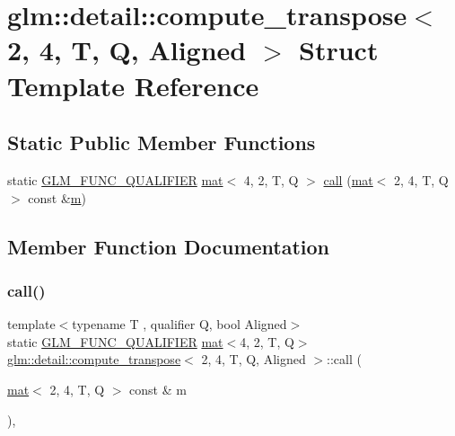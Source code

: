 \hypertarget{structglm_1_1detail_1_1compute__transpose_3_012_00_014_00_01_t_00_01_q_00_01_aligned_01_4}{}\section{glm\+:\+:detail\+:\+:compute\+\_\+transpose$<$ 2, 4, T, Q, Aligned $>$ Struct Template Reference}
\label{structglm_1_1detail_1_1compute__transpose_3_012_00_014_00_01_t_00_01_q_00_01_aligned_01_4}
\subsection*{Static Public Member Functions}
\begin{DoxyCompactItemize}
\item 
static \mbox{\hyperlink{setup_8hpp_a33fdea6f91c5f834105f7415e2a64407}{G\+L\+M\+\_\+\+F\+U\+N\+C\+\_\+\+Q\+U\+A\+L\+I\+F\+I\+ER}} \mbox{\hyperlink{structglm_1_1mat}{mat}}$<$ 4, 2, T, Q $>$ \mbox{\hyperlink{structglm_1_1detail_1_1compute__transpose_3_012_00_014_00_01_t_00_01_q_00_01_aligned_01_4_a520d7f20fa96a98fd40229e593ac0b2a}{call}} (\mbox{\hyperlink{structglm_1_1mat}{mat}}$<$ 2, 4, T, Q $>$ const \&\mbox{\hyperlink{_s_d_l__opengl__glext_8h_af593500c283bf1a787a6f947f503a5c2}{m}})
\end{DoxyCompactItemize}


\subsection{Member Function Documentation}
\mbox{\label{structglm_1_1detail_1_1compute__transpose_3_012_00_014_00_01_t_00_01_q_00_01_aligned_01_4_a520d7f20fa96a98fd40229e593ac0b2a}} 
\subsubsection{\texorpdfstring{call()}{call()}}
{\footnotesize\ttfamily template$<$typename T , qualifier Q, bool Aligned$>$ \\
static \mbox{\hyperlink{setup_8hpp_a33fdea6f91c5f834105f7415e2a64407}{G\+L\+M\+\_\+\+F\+U\+N\+C\+\_\+\+Q\+U\+A\+L\+I\+F\+I\+ER}} \mbox{\hyperlink{structglm_1_1mat}{mat}}$<$4, 2, T, Q$>$ \mbox{\hyperlink{structglm_1_1detail_1_1compute__transpose}{glm\+::detail\+::compute\+\_\+transpose}}$<$ 2, 4, T, Q, Aligned $>$\+::call (\begin{DoxyParamCaption}\item[{\mbox{\hyperlink{structglm_1_1mat}{mat}}$<$ 2, 4, T, Q $>$ const \&}]{m }\end{DoxyParamCaption})\hspace{0.3cm}{\ttfamily [inline]}, {\ttfamily [static]}}



